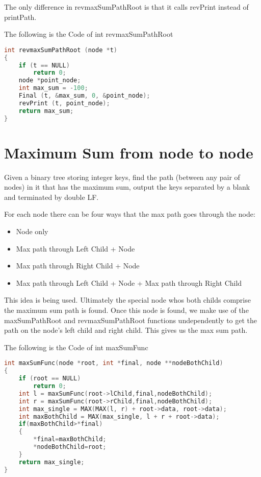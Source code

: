 \documentclass{article}
\begin{document}
The only difference in revmaxSumPathRoot is that it calls revPrint instead of printPath.

The following is the Code of int revmaxSumPathRoot
\begin{lstlisting}[language=c, caption=elimin\_solve]
int revmaxSumPathRoot (node *t)
{
    if (t == NULL)
        return 0;
    node *point_node;
    int max_sum = -100;
    Final (t, &max_sum, 0, &point_node);
    revPrint (t, point_node); 
    return max_sum;
}
\end{lstlisting}

\section{Maximum Sum from node to node}

Given a binary tree storing integer keys, find the path (between any pair of nodes) in it that has the maximum sum, output the keys separated by a blank and terminated by double LF.

For each node there can be four ways that the max path goes through the node:
\begin{itemize}
  \item Node only
  \item Max path through Left Child + Node
  \item Max path through Right Child + Node
  \item Max path through Left Child + Node + Max path through Right Child
\end{itemize}

This idea is being used. Ultimately the special node whos both childs comprise the maximum sum path is found. Once this node is found, we make use of the maxSumPathRoot and revmaxSumPathRoot functions undependently to get the path on the node's left child and right child. This gives us the max sum path.

The following is the Code of int maxSumFunc
\begin{lstlisting}[language=c, caption=check\_print]
int maxSumFunc(node *root, int *final, node **nodeBothChild)
{
    if (root == NULL)
        return 0;
    int l = maxSumFunc(root->lChild,final,nodeBothChild);
    int r = maxSumFunc(root->rChild,final,nodeBothChild);
    int max_single = MAX(MAX(l, r) + root->data, root->data);
    int maxBothChild = MAX(max_single, l + r + root->data);
    if(maxBothChild>*final)
    {
        *final=maxBothChild;
        *nodeBothChild=root;
    }
    return max_single;
}
\end{lstlisting}
\end{document}
